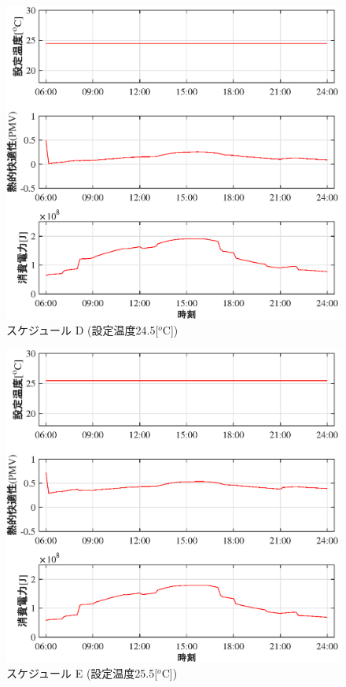 \begin{figure}[htbp]
  \begin{center}
    \begin{minipage}{0.5\textwidth}
      \begin{center}
        \includegraphics[width=1.0\textwidth,keepaspectratio=true]{fig/sim_result_schedule_d.eps}\\{スケジュール D (設定温度24.5[$^o$C])}
      \end{center}
    \end{minipage}
    \hspace{2cm}
    \begin{minipage}{0.5\textwidth}
      \begin{center}
        \includegraphics[width=1.0\textwidth,keepaspectratio=true]{fig/sim_result_schedule_e.eps}\\{スケジュール E (設定温度25.5[$^o$C])}

\end{center}
\end{minipage}
\end{center}
\end{figure}
